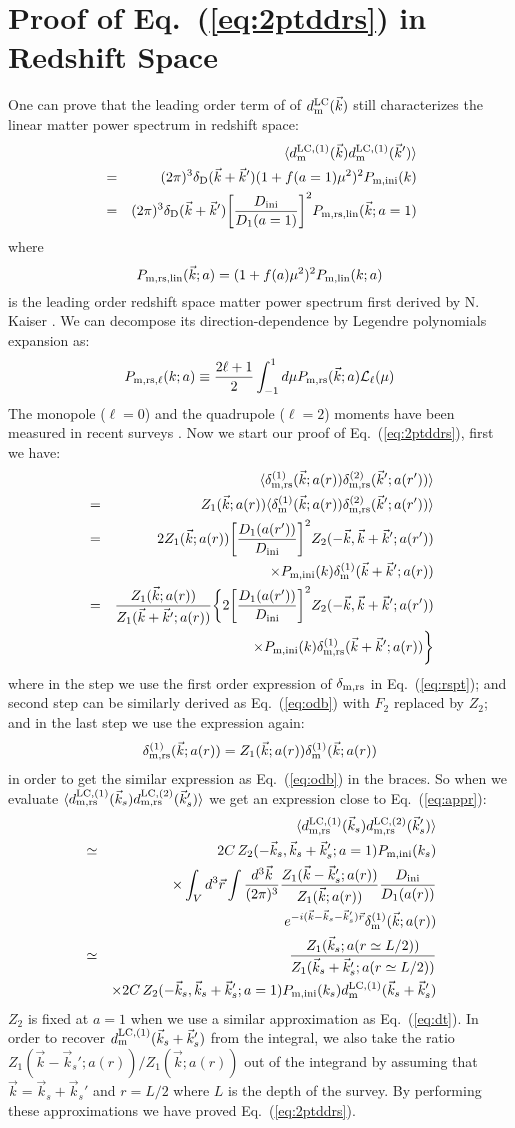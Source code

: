 \documentclass[prd,amsmath,amssymb,floatfix,superscriptaddress,nofootinbib,twocolumn]{revtex4-1}
\def\be{\begin{equation}}
\def\ee{\end{equation}}
\def\bea{\begin{eqnarray}}
\def\eea{\end{eqnarray}}
\newcommand{\rs}{\rm rs}
\newcommand{\LC}{\rm LC}
\newcommand{\ini}{\rm ini}
\newcommand{\vrr}{\vec{r}}
\newcommand{\vs}{\nonumber\\}
\newcommand{\vk}{\vec{k}}
\newcommand{\ec}[1]{Eq.~(\ref{eq:#1})}
\newcommand{\eql}[1]{\label{eq:#1}}
\begin{document}
\section{Proof of \ec{2ptddrs} in Redshift Space} \label{appenda}
One can prove that the leading order term of of $d^{\LC}_{\rm m}(\vk)$ still characterizes the linear matter power spectrum in redshift space:
\bea 
&&\langle d^{\LC,(\rm 1)}_{\rm m}(\vk) d^{\LC,(\rm 1)}_{\rm m}(\vk') \rangle\vs
& = &(2\pi)^3 \delta_{\rm D}(\vk+\vk')(1+f(a=1)\mu^2)^2 P_{\rm m,ini}(k)\vs
&= &(2\pi)^3 \delta_{\rm D}(\vk+\vk')\bigg[ \frac{D_{\ini}}{D_1(a=1)}\bigg]^2 P_{\rm m,rs,lin}(\vk;a=1)\vs \eql{lpsrs}
\eea 
where 
\be 
P_{\rm m,rs,lin}(\vk;a)=(1+f(a)\mu^2)^2 P_{\rm m,lin}(k;a) \eql{kaiser}
\ee 
is the leading order redshift space matter power spectrum first derived by N. Kaiser \cite{Kaiser:1987rsd}. We can decompose its direction-dependence by Legendre polynomials expansion as:
\be 
P_{\rm m,rs,\ell}(k;a)\equiv \frac{2\ell+1}{2}\int_{-1}^{1}d\mu P_{\rm m,rs}(\vk;a) \mathcal{L}_{\ell}(\mu)
\ee 
The monopole ($\ell=0$) and the quadrupole ($\ell=2$) moments have been measured in recent surveys \cite{Gil-Marin:2015sqa}. Now we start our proof of \ec{2ptddrs}, first we have:
\bea 
&&\langle \delta_{\rm m,\rs}^{(1)}(\vk;a(r))\delta_{\rm m,\rs}^{(2)}(\vk';a(r'))\rangle\vs 
&=&Z_{1}(\vk;a(r))\langle \delta_{\rm m}^{(1)}(\vk;a(r))\delta_{\rm m,\rs}^{(2)}(\vk';a(r'))\rangle\vs 
&=&2Z_{1}(\vk;a(r))\bigg[\frac{D_{1}(a(r'))}{D_{\ini}} \bigg]^{2}Z_{2}(-\vk,\vk+\vk';a(r'))\vs
&& \times P_{\rm m,\ini}(k)\delta_{\rm m}^{(1)}(\vk+\vk';a(r))\vs 
&=&\frac{Z_{1}(\vk;a(r))}{Z_{1}(\vk+\vk';a(r))}\bigg\{2\bigg[\frac{D_{1}(a(r'))}{D_{\ini}} \bigg]^{2}Z_{2}(-\vk,\vk+\vk';a(r')) \vs
&& \times P_{\rm m,\ini}(k)\delta_{\rm m,\rs}^{(1)}(\vk+\vk';a(r))\bigg\}
\eea 
where in the step we use the first order expression of $\delta_{\rm m, \rs}$ in \ec{rspt}; and second step can be similarly derived as \ec{odb} with $F_2$ replaced by $Z_2$; and in the last step we use the expression again:
\be 
\delta_{\rm m,\rs}^{(1)}(\vk;a(r))=Z_{1}(\vk;a(r))\delta_{\rm m}^{(1)}(\vk;a(r))
\ee 
in order to get the similar expression as \ec{odb} in the braces. So when we evaluate $\langle d_{\rm m,\rs}^{\LC,(1)}(\vk_s) d_{\rm m,\rs}^{\LC,(2)}(\vk'_s)\rangle$ we get an expression close to \ec{appr}:
\bea 
&& \langle d^{\rm LC,(1)}_{\rm m,\rs}(\vk_s)d^{\rm LC,(2)}_{\rm m,\rs}(\vk_s') \rangle \vs 
&\simeq & 2C\,Z_{2}(-\vk_s,\vk_s+\vk_s';a=1)P_{\rm m,\ini}(k_s) \vs
&& \times \int_{V} d^{3} \vrr\int \frac{d^{3}\vk}{(2\pi)^3}\frac{Z_{1}(\vk-\vk_s';a(r))}{Z_{1}(\vk;a(r))}\frac{D_{\ini}}{D_{1}(a(r))}\vs
&&\qquad e^{-i(\vk-\vk_s-\vk_s')\vrr}\delta_{\rm m}^{(1)}(\vk;a(r))\vs
&\simeq & \frac{Z_{1}(\vk_s;a(r\simeq L/2 ) )}{Z_{1}(\vk_s+\vk_s';a(r\simeq L/2 ))} \vs 
&&\times2C\,Z_{2}(-\vk_s,\vk_s+\vk_s';a=1) P_{\rm m,\ini}(k_s)d_{\rm m}^{\rm LC,(1)}(\vk_s+\vk_s') \vs\eql{apprrs}
\eea 
$Z_2$ is fixed at $a=1$ when we use a similar approximation as \ec{dt}. In order to recover $d_{\rm m}^{\rm LC,(1)}(\vk_s+\vk_s')$ from the integral, we also take the ratio ${Z_{1}(\vk-\vk_s';a(r))}/{Z_{1}(\vk;a(r))}$ out of the integrand by assuming that $\vk=\vk_s+\vk_s'$ and $r=L/2$ where $L$ is the depth of the survey. By performing these approximations we have proved \ec{2ptddrs}.
\end{document}
